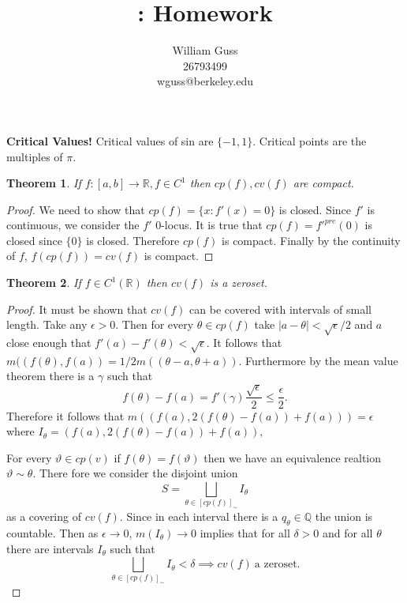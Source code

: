 \documentclass[letter]{article}
\title{\bCLASS: Homework \bHWN}
\author{William Guss\\26793499\\wguss@berkeley.edu}
\newtheorem{theorem}{Theorem}
\newenvironment{menumerate}{%
  \edef\backupindent{\the\parindent}%
  \enumerate%
  \setlength{\parindent}{\backupindent}%
}{\endenumerate}
\begin{document}
\maketitle
\thispagestyle{empty}


\begin{menumerate}
	\setcounter{enumi}{64}
	\item \textbf{Critical Values!}
	Critical values of sin are $\{-1,1\}$. Critical points are the multiples of $\pi$.
	\begin{theorem}
		If $f:[a,b] \to \mathbb{R}, f \in C^1$ then $cp(f), cv(f)$ are compact.
	\end{theorem}
	\begin{proof}We need to show that $cp(f) = \{x : f'(x) = 0\}$ is closed. 
		Since $f'$ is continuous, we consider the $f'$ 0-locus. It is true
		that $cp(f) = {f'}^{pre}(0)$ is closed since $\{0\}$ is closed. Therefore
		$cp(f)$ is compact. Finally by the continuity of $f$, $f(cp(f)) = cv(f)$ is compact.
	\end{proof}
	\begin{theorem}
		If $f \in C^1(\mathbb{R})$ then $cv(f)$ is a zeroset.
	\end{theorem}
	\begin{proof}
		It must be shown that $cv(f)$ can be covered with intervals of small length. Take any $\epsilon >0$. Then for every $\theta \in cp(f)$
		take $|a - \theta| < \sqrt{\epsilon}/2$ and $a$ close enough that $f'(a) - f'(\theta) < \sqrt{\epsilon}.$ It follows that $m((f(\theta), f(a)) = 1/2m((\theta -a, \theta + a)).$ Furthermore by the mean value theorem there is a $\gamma$ such that
		\begin{equation}
			f(\theta) - f(a) = f'(\gamma)\frac{\sqrt{\epsilon}}{2} \leq \frac{\epsilon}{2}.
		\end{equation}
		Therefore it follows that $m((f(a), 2(f(\theta) - f(a)) +f(a))) = \epsilon$ where $I_\theta = (f(a), 2(f(\theta) - f(a)) +f(a)),$

		For every $\vartheta \in cp(v)$ if $f(\theta) = f(\vartheta)$ then we have an equivalence realtion $\vartheta \sim \theta$. There fore we consider the disjoint union 
		\begin{equation}
			S = \bigsqcup_{\theta \in [cp(f)]_\sim} I_\theta 
		\end{equation}
		as a covering of $cv(f).$ Since in each interval there is a $q_\theta \in \mathbb{Q}$ the union is countable. Then as $\epsilon \to 0$, $m(I_\theta) \to 0$ implies that for all $\delta > 0$ and for all $\theta$ there are intervals $I_\theta$ such that 
		\begin{equation}
			\bigsqcup_{\theta \in [cp(f)]_\sim} I_\theta < \delta \implies cv(f)\ \text{a zeroset.}
		\end{equation}


\end{proof}
\end{menumerate}
\end{document}
